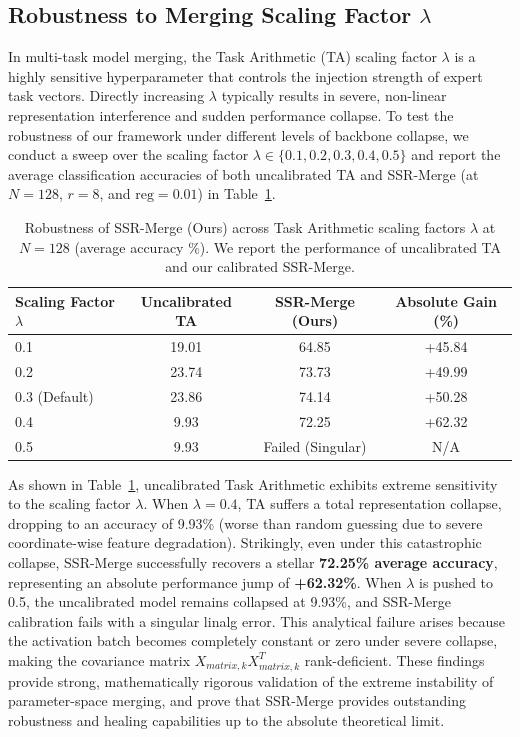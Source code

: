 \documentclass{article}
\theoremstyle{plain}
\theoremstyle{definition}
\theoremstyle{remark}
\begin{document}
\subsection{Robustness to Merging Scaling Factor \texorpdfstring{$\lambda$}{lambda}}
In multi-task model merging, the Task Arithmetic (TA) scaling factor $\lambda$ is a highly sensitive hyperparameter that controls the injection strength of expert task vectors. Directly increasing $\lambda$ typically results in severe, non-linear representation interference and sudden performance collapse. To test the robustness of our framework under different levels of backbone collapse, we conduct a sweep over the scaling factor $\lambda \in \{0.1, 0.2, 0.3, 0.4, 0.5\}$ and report the average classification accuracies of both uncalibrated TA and SSR-Merge (at $N=128$, $r=8$, and $\text{reg}=0.01$) in Table~\ref{tab:ta_scaling_sweep}.

\begin{table}[t]
\caption{Robustness of SSR-Merge (Ours) across Task Arithmetic scaling factors $\lambda$ at $N=128$ (average accuracy \%). We report the performance of uncalibrated TA and our calibrated SSR-Merge.}
\label{tab:ta_scaling_sweep}
\vskip 0.15in
\begin{center}
\begin{small}
\begin{tabular}{lccc}
\toprule
Scaling Factor $\lambda$ & Uncalibrated TA & SSR-Merge (Ours) & Absolute Gain (\%) \\
\midrule
0.1 & 19.01 & 64.85 & +45.84 \\
0.2 & 23.74 & 73.73 & +49.99 \\
0.3 (Default) & 23.86 & 74.14 & +50.28 \\
0.4 & 9.93 & 72.25 & +62.32 \\
0.5 & 9.93 & Failed (Singular) & N/A \\
\bottomrule
\end{tabular}
\end{small}
\end{center}
\vskip -0.1in
\end{table}

As shown in Table~\ref{tab:ta_scaling_sweep}, uncalibrated Task Arithmetic exhibits extreme sensitivity to the scaling factor $\lambda$. When $\lambda = 0.4$, TA suffers a total representation collapse, dropping to an accuracy of 9.93\% (worse than random guessing due to severe coordinate-wise feature degradation). Strikingly, even under this catastrophic collapse, SSR-Merge successfully recovers a stellar \textbf{72.25\% average accuracy}, representing an absolute performance jump of \textbf{+62.32\%}. 
When $\lambda$ is pushed to 0.5, the uncalibrated model remains collapsed at 9.93\%, and SSR-Merge calibration fails with a singular linalg error. This analytical failure arises because the activation batch becomes completely constant or zero under severe collapse, making the covariance matrix $X_{matrix,k} X_{matrix,k}^T$ rank-deficient. These findings provide strong, mathematically rigorous validation of the extreme instability of parameter-space merging, and prove that SSR-Merge provides outstanding robustness and healing capabilities up to the absolute theoretical limit.
\end{document}
